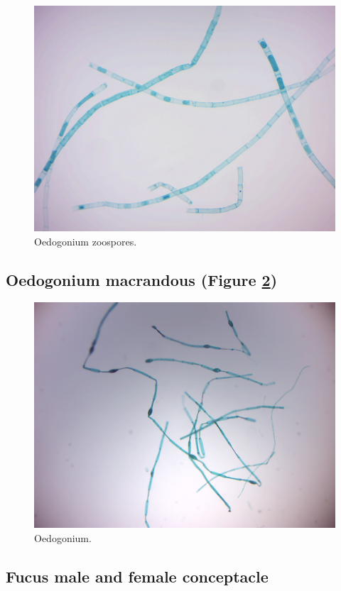 \begin{figure}

{\centering \includegraphics[width=0.7\linewidth]{./figures/protists/Oedogonium_zoospore_formation} 

}

\caption{Oedogonium zoospores.}\label{fig:oedogoniumzoospores}
\end{figure}

\subsection{Oedogonium macrandous (Figure
\ref{fig:oedogoniumprepared})}\label{oedogonium-macrandous-figure-reffigoedogoniumprepared}

\begin{figure}

{\centering \includegraphics[width=0.7\linewidth]{./figures/protists/Oedogonium_macrandrous} 

}

\caption{Oedogonium.}\label{fig:oedogoniumprepared}
\end{figure}

\subsection{Fucus male and female
conceptacle}\label{fucus-male-and-female-conceptacle}

